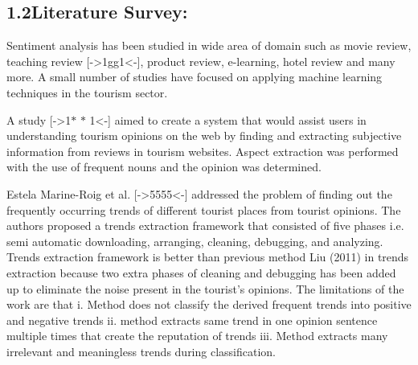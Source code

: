 \documentclass[12pt]{article}
\begin{document}
\vspace{\baselineskip}

\vspace{\baselineskip}

\vspace{\baselineskip}
\subsection*{1.2\hspace*{10pt}Literature Survey:}
\begin{justify}
Sentiment analysis has been studied in wide area of domain such as movie review, teaching review [->1gg1<-], product review, e-learning, hotel review and many more. A small number of studies have focused on applying machine learning techniques in the tourism sector. 
\end{justify}\par


\vspace{\baselineskip}
\begin{justify}
\tab  A study [->1$\ast$ $\ast$ 1<-] aimed to create a system that would assist users in understanding tourism opinions on the web by finding and extracting subjective information from reviews in tourism websites. Aspect extraction was performed with the use of frequent nouns and the opinion was determined. 
\end{justify}\par


\vspace{\baselineskip}
\begin{justify}
\tab Estela Marine-Roig et al. [->5555<-] addressed the problem of finding out the frequently occurring trends of different tourist places from tourist opinions. The authors proposed a trends extraction framework that consisted of five phases i.e. semi automatic downloading, arranging, cleaning, debugging, and analyzing. Trends extraction framework is better than previous method Liu (2011) in trends extraction because two extra phases of cleaning and debugging has been added up to eliminate the noise present in the tourist's opinions. The limitations of the work are that i. Method does not classify the derived frequent trends into positive and negative trends ii. method extracts same trend in one opinion sentence multiple times that create the reputation of trends iii. Method extracts many irrelevant and meaningless trends during classification. 
\end{justify}\par
\end{document}
